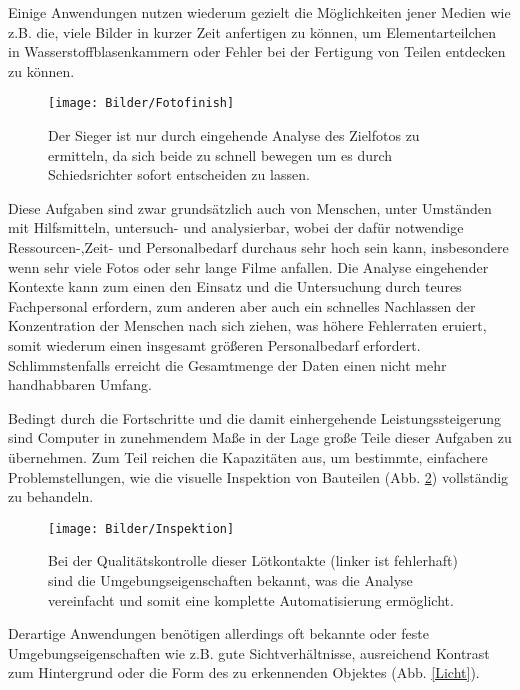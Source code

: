 Einige Anwendungen nutzen wiederum gezielt die Möglichkeiten jener Medien wie z.B. die, viele Bilder in kurzer Zeit anfertigen zu können, um Elementarteilchen in Wasserstoffblasenkammern oder Fehler bei der Fertigung von Teilen entdecken zu können. \cite{Jaehne2002}
\begin{figure}[!b]
\centering
\texttt{[image: Bilder/Fotofinish]}
\caption{Der Sieger ist nur durch eingehende Analyse des Zielfotos zu ermitteln, da sich beide zu schnell bewegen um es durch Schiedsrichter sofort entscheiden zu lassen. \cite{Cyclingnews}}
\label{Zielfoto}
\end{figure}

Diese Aufgaben sind zwar grundsätzlich auch von Menschen, unter Umständen mit Hilfsmitteln, untersuch- und analysierbar, wobei der dafür notwendige Ressourcen-,\linebreak Zeit- und Personalbedarf durchaus sehr hoch sein kann, insbesondere wenn sehr viele Fotos oder sehr lange Filme anfallen. Die Analyse eingehender Kontexte kann zum einen den Einsatz und die Untersuchung durch teures Fachpersonal erfordern, zum anderen aber auch ein schnelles Nachlassen der Konzentration der Menschen nach sich ziehen, was höhere Fehlerraten eruiert, somit wiederum einen insgesamt größeren Personalbedarf erfordert.
Schlimmstenfalls erreicht die Gesamtmenge der Daten einen nicht mehr handhabbaren Umfang.\pagebreak

\noindent Bedingt durch die Fortschritte und die damit einhergehende Leistungssteigerung sind Computer in zunehmendem Maße in der Lage große Teile dieser Aufgaben zu übernehmen. Zum Teil reichen die Kapazitäten aus, um bestimmte, einfachere Problemstellungen, wie die visuelle Inspektion von Bauteilen (Abb. \ref{Bauteilinspektion}) vollständig zu behandeln. \cite{Jaehne2002}
\begin{figure}[!t]
\centering
\texttt{[image: Bilder/Inspektion]}
\caption{Bei der Qualitätskontrolle dieser Lötkontakte (linker ist fehlerhaft) sind die Umgebungseigenschaften bekannt, was die Analyse vereinfacht und somit eine komplette Automatisierung ermöglicht. \cite{Jaehne2002}}
\label{Bauteilinspektion}
\end{figure}

Derartige Anwendungen benötigen allerdings oft bekannte oder feste Umgebungseigenschaften wie z.B. gute Sichtverhältnisse, ausreichend Kontrast zum Hintergrund oder die Form des zu erkennenden Objektes (Abb. \ref{Licht}).

